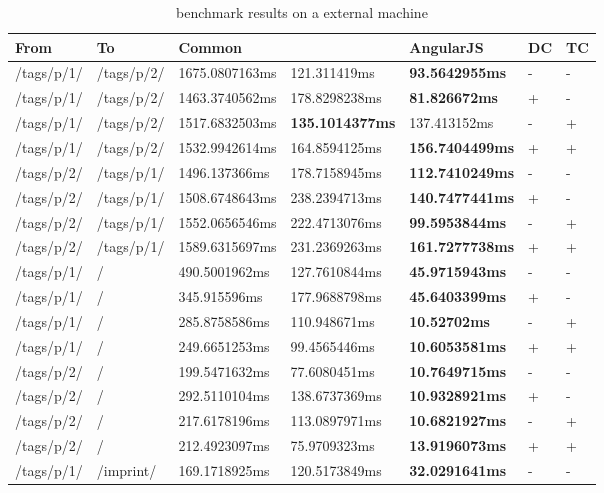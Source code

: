 \begin{appendix}
\begin{center}
\small
\begin{longtable}{lllllll}
    \caption{\selenium{} benchmark results on a external machine}
    \\
	\hline
	\textbf{From} & \textbf{To} & \textbf{Common} & \textbf{\lare{}} & \textbf{AngularJS} &  \textbf{DC} & \textbf{TC} \\
	\hline
	/tags/p/1/ & /tags/p/2/ & 1675.0807163ms & 121.311419ms & \textbf{93.5642955ms} & - & - \\
	/tags/p/1/ & /tags/p/2/ & 1463.3740562ms & 178.8298238ms & \textbf{81.826672ms} & + & - \\
	/tags/p/1/ & /tags/p/2/ & 1517.6832503ms & \textbf{135.1014377ms} & 137.413152ms & - & + \\
	/tags/p/1/ & /tags/p/2/ & 1532.9942614ms & 164.8594125ms & \textbf{156.7404499ms} & + & + \\
	\hline
	/tags/p/2/ & /tags/p/1/ & 1496.137366ms & 178.7158945ms & \textbf{112.7410249ms} & - & - \\
	/tags/p/2/ & /tags/p/1/ & 1508.6748643ms & 238.2394713ms & \textbf{140.7477441ms} & + & - \\
	/tags/p/2/ & /tags/p/1/ & 1552.0656546ms & 222.4713076ms & \textbf{99.5953844ms} & - & + \\
	/tags/p/2/ & /tags/p/1/ & 1589.6315697ms & 231.2369263ms & \textbf{161.7277738ms} & + & + \\
	\hline
	\hline
	/tags/p/1/ & / & 490.5001962ms & 127.7610844ms & \textbf{45.9715943ms} & - & - \\
	/tags/p/1/ & / & 345.915596ms & 177.9688798ms & \textbf{45.6403399ms} & + & - \\
	/tags/p/1/ & / & 285.8758586ms & 110.948671ms & \textbf{10.52702ms} & - & + \\
	/tags/p/1/ & / & 249.6651253ms & 99.4565446ms & \textbf{10.6053581ms} & + & + \\
	\hline
	/tags/p/2/ & / & 199.5471632ms & 77.6080451ms & \textbf{10.7649715ms} & - & - \\
	/tags/p/2/ & / & 292.5110104ms & 138.6737369ms & \textbf{10.9328921ms} & + & - \\
	/tags/p/2/ & / & 217.6178196ms & 113.0897971ms & \textbf{10.6821927ms} & - & + \\
	/tags/p/2/ & / & 212.4923097ms & 75.9709323ms & \textbf{13.9196073ms} & + & + \\
	\hline
	/tags/p/1/ & /imprint/ & 169.1718925ms & 120.5173849ms & \textbf{32.0291641ms} & - & - \\

\end{longtable}
\end{center}
\end{appendix}
